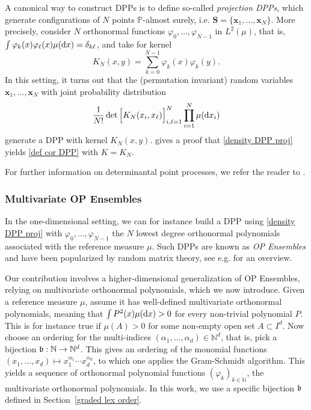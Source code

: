 \documentclass[a4paper,11pt]{article}
\numberwithin{equation}{section}
\theoremstyle{definition}
\newcommand{\rev}[1]{#1}
\newcommand{\eq}{\begin{equation}}
\newcommand{\qe}{\end{equation}}
\newcommand{\N}{\mathbb{N}}
\renewcommand{\P}{\mathbb{P}}
\newcommand{\bv}{\mathbf}
\renewcommand{\phi}{\varphi}
\renewcommand{\d}{ {\rm d}}
\begin{document}
A canonical way to construct DPPs is to define so-called \emph{projection DPPs}, which generate configurations of $N$ points $\P$-almost surely, i.e. $\bv S=\{\bv
x_1,\ldots,\bv x_N\}$. More precisely, consider $N$ orthonormal functions
$\phi_0,\ldots,\phi_{N-1}$ in $L^2(\mu)$, that is, $\int
\phi_k(x)\phi_\ell(x)\mu(\d x)=\delta_{k\ell}$, and take for kernel
\eq
\label{kernel DPP}
K_N(x,y)=\sum_{k=0}^{N-1}\phi_k(x)\phi_k(y).
\qe
In this setting, it turns out that the (permutation invariant) random variables $\bv x_1,\ldots,\bv x_N$ with joint probability distribution
\eq
\label{density DPP proj}
\frac1{N!}\det\Big[K_N(x_i,x_\ell)\Big]_{i,\ell=1}^N\prod_{i=1}^N\mu(\d x_i)
\qe
generate a DPP with kernel $K_N(x,y)$. \rev{\cite[Section 2]{HKPV06} gives a proof that \eqref{density DPP proj} yields \eqref{def cor DPP} with $K=K_N$.}

For further information on determinantal
point processes, we refer the reader to \citep{Mac75, HKPV06, Joh06, Sos00b, Lyo03,KuTa12,LaMoRu15}.

\subsubsection{Multivariate OP Ensembles}
\label{def MOP}
In the one-dimensional setting, we can for instance build a DPP using
\eqref{density DPP proj} with
$\phi_0,\text{...},\phi_{N-1}$ the $N$ lowest degree orthonormal polynomials
associated with the reference measure $\mu$. Such DPPs are known as \emph{OP Ensembles} and have been popularized by random matrix theory, see e.g.
\citep{Kon05} for an overview.

Our contribution involves a higher-dimensional generalization of OP Ensembles,
relying on multivariate orthonormal polynomials, which we now introduce. Given a
reference measure $\mu$, assume it has well-defined multivariate orthonormal
polynomials, meaning that $\int P^2(x) \mu(\d x)>0$ for every non-trivial polynomial
$P$. This is for instance true if $\mu(A)>0$ for some non-empty open set
$A\subset I^d$. Now choose an ordering for the multi-indices
$(\alpha_1,\ldots,\alpha_d)\in\N^d$, that is, pick a bijection $\frak b:\N\to\N^d$. This gives an ordering of the monomial functions $(x_1,\ldots,x_d)\mapsto x_1^{\alpha_1}\cdots x_d^{\alpha_d}$,
to which one applies the Gram-Schmidt algorithm. This yields a sequence of
orthonormal polynomial functions $(\phi_k)_{k\in\N}$, the multivariate
orthonormal polynomials. In this work, we use a specific
bijection $\frak b$ defined in Section~\ref{graded lex order}.
\end{document}
